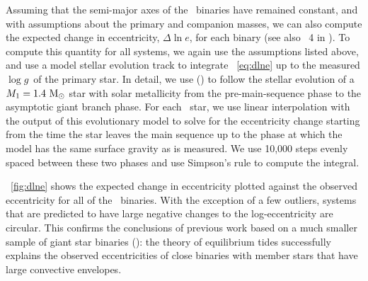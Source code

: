\documentclass[modern, letterpaper]{aastex62}
\newcommand{\apogee}{\project{\acronym{APOGEE}}}
\newcommand{\logg}{\ensuremath{\log g}}
\begin{document}
Assuming that the semi-major axes of the \apogee\ binaries have remained
constant, and with assumptions about the primary and companion masses, we can
also compute the expected change in eccentricity, $\Delta \ln e$, for each
binary (see also \figurename~4 in \citealt{Verbunt:1995}).
To compute this quantity for all systems, we again use the assumptions listed
above, and use a model stellar evolution track to integrate
\eqname~\ref{eq:dlne} up to the measured \logg\ of the primary star.
In detail, we use  (\citealt{Paxton:2011}) to follow the stellar
evolution of a $M_1 = 1.4~\mathrm{M}_\odot$ star with solar metallicity from the
pre-main-sequence phase to the asymptotic giant branch phase.
For each \apogee\ star, we use linear interpolation with the output of this
evolutionary model to solve for the eccentricity change starting from the time
the star leaves the main sequence up to the phase at which the model has the
same surface gravity as is measured.
We use 10,000 steps evenly spaced between these two phases and use Simpson's
rule to compute the integral.

\figurename~\ref{fig:dlne} shows the expected change in eccentricity plotted
against the observed eccentricity for all of the \apogee\ binaries.
With the exception of a few outliers, systems that are predicted to have large
negative changes to the log-eccentricity are circular.
This confirms the conclusions of previous work based on a much smaller sample of
giant star binaries (\citealt{Verbunt:1995}): the theory of equilibrium tides
successfully explains the observed eccentricities of close binaries with
member stars that have large convective envelopes.
\end{document}
